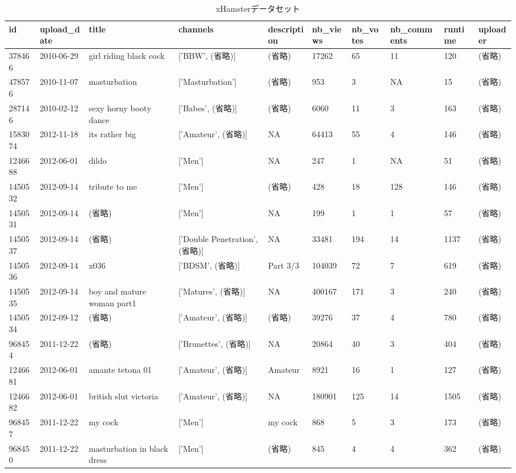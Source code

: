 \documentclass[uplatex]{jsarticle}
\begin{document}
\begin{landscape}
\begin{table}[htb]
\begin{center}
\caption{xHamsterデータセット}
    \begin{tabular}{llllllllll}
    \hline
    id & upload\_date & title & channels & description & nb\_views & nb\_votes & nb\_comments & runtime & uploader \\
    \hline
    378466 & 2010-06-29 & girl riding black cock & ['BBW', (省略)] & (省略) & 17262 & 65 & 11 & 120 & (省略) \\
    478576 & 2010-11-07 & masturbation & ['Masturbation'] & (省略) & 953 & 3 & NA & 15 & (省略) \\
    287146 & 2010-02-12 & sexy horny booty dance & ['Babes', (省略)] & (省略) & 6060 & 11 & 3 & 163 & (省略) \\
    1583074 & 2012-11-18 & its rather big & ['Amateur', (省略)] & NA & 64413 & 55 & 4 & 146 & (省略) \\
    1246688 & 2012-06-01 & dildo & ['Men'] & NA & 247 & 1 & NA & 51 & (省略) \\
    1450532 & 2012-09-14 & tribute to me & ['Men'] & (省略) & 428 & 18 & 128 & 146 & (省略) \\
    1450531 & 2012-09-14 & (省略) & ['Men'] & NA & 199 & 1 & 1 & 57 & (省略) \\
    1450537 & 2012-09-14 & (省略) & ['Double Penetration', (省略)] & NA & 33481 & 194 & 14 & 1137 & (省略) \\
    1450536 & 2012-09-14 & x036 & ['BDSM', (省略)] & Part 3/3 & 104039 & 72 & 7 & 619 & (省略) \\
    1450535 & 2012-09-14 & boy and mature woman part1 & ['Matures', (省略)] & NA & 400167 & 171 & 3 & 240 & (省略) \\
    1450534 & 2012-09-12 & (省略) & ['Amateur', (省略)] & (省略) & 39276 & 37 & 4 & 780 & (省略) \\
    968454 & 2011-12-22 & (省略) & ['Brunettes', (省略)] & NA & 20864 & 40 & 3 & 404 & (省略) \\
    1246681 & 2012-06-01 & amante tetona 01 & ['Amateur', (省略)] & Amateur & 8921 & 16 & 1 & 127 & (省略) \\
    1246682 & 2012-06-01 & british slut victoria & ['Amateur', (省略)] & NA & 180901 & 125 & 14 & 1505 & (省略) \\
    968457 & 2011-12-22 & my cock & ['Men'] & my cock & 868 & 5 & 3 & 173 & (省略) \\
    968450 & 2011-12-22 & masturbation in black dress & ['Men'] & (省略) & 845 & 4 & 4 & 362 & (省略) \\

\end{tabular}
\end{center}
\end{table}
\end{landscape}
\end{document}
